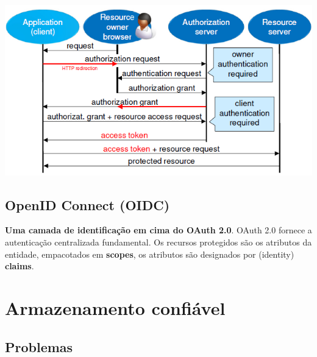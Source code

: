 \documentclass{article}
\begin{document}
\begin{center}
  \includegraphics[scale=0.6]{29}
\end{center}

\subsection{OpenID Connect (OIDC)}

\begin{flushleft}
  \textbf{Uma camada de identificação em cima do OAuth 2.0}.
  OAuth 2.0 fornece a autenticação centralizada fundamental.
  Os recursos protegidos são os atributos da entidade,
  empacotados em \textbf{scopes}, os atributos são designados
  por (identity) \textbf{claims}.
\end{flushleft}

\pagebreak

\section{Armazenamento confiável}

\subsection{Problemas}
\end{document}
